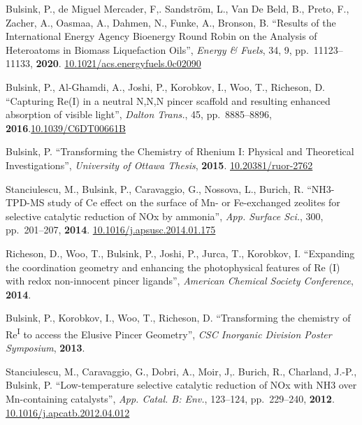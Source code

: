 \documentclass[margin,line]{resumecls}
\begin{document}
\begin{resume}
    \vspace{0mm}
    Bulsink, P., de Miguel Mercader, F,. Sandström, L., Van De Beld, B., Preto, F., Zacher, A., Oasmaa, A., Dahmen, N., Funke, A., Bronson, B. ``Results of the International Energy Agency Bioenergy Round Robin on the Analysis of Heteroatoms in Biomass Liquefaction Oils'', \textit{Energy \& Fuels}, 34, 9, pp.\ 11123--11133, \textbf{2020}. \href{https://doi.org/10.1021/acs.energyfuels.0c02090}{10.1021/acs.energyfuels.0c02090}

    \vspace{0mm}
    Bulsink, P., Al-Ghamdi, A., Joshi, P., Korobkov, I., Woo, T., Richeson, D. ``Capturing Re(I) in a neutral N,N,N pincer scaffold and resulting enhanced absorption of visible light'', \textit{Dalton Trans.}, 45, pp.\ 8885--8896, \textbf{2016}.\href{https://doi.org/10.1039/C6DT00661B}{10.1039/C6DT00661B}

     \vspace{0mm}
    Bulsink, P. ``Transforming the Chemistry of Rhenium I: Physical and Theoretical Investigations'', \textit{University of Ottawa Thesis}, \textbf{2015}. \href{http://dx.doi.org/10.20381/ruor-2762}{10.20381/ruor-2762}

 	\vspace{0mm}
    Stanciulescu, M., Bulsink, P., Caravaggio, G., Nossova, L., Burich, R. ``NH3-TPD-MS study of Ce effect on the surface of Mn- or Fe-exchanged zeolites for selective catalytic reduction of NOx by ammonia'', \textit{App. Surface Sci.}, 300, pp.\ 201--207, \textbf{2014}. \href{https://doi.org/10.1016/j.apsusc.2014.01.175}{10.1016/j.apsusc.2014.01.175}

    \vspace{0mm}
    Richeson, D., Woo, T., Bulsink, P., Joshi, P., Jurca, T., Korobkov, I. ``Expanding the coordination geometry and enhancing the photophysical features of Re (I) with redox non-innocent pincer ligands'', \textit{American Chemical Society Conference}, \textbf{2014}.

	\vspace{0mm}
    Bulsink, P., Korobkov, I., Woo, T., Richeson, D. ``Transforming the chemistry of Re\textsuperscript{I} to access the Elusive Pincer Geometry'', \textit{CSC Inorganic Division Poster Symposium}, \textbf{2013}.

	\vspace{0mm}
    Stanciulescu, M., Caravaggio, G., Dobri, A., Moir, J,. Burich, R., Charland, J.-P., Bulsink, P. ``Low-temperature selective catalytic reduction of NOx with NH3 over Mn-containing catalysts'', \textit{App. Catal. B: Env.}, 123--124, pp.\ 229--240, \textbf{2012}. \href{https://doi.org/10.1016/j.apcatb.2012.04.012}{10.1016/j.apcatb.2012.04.012}


\end{resume}
\end{document}
